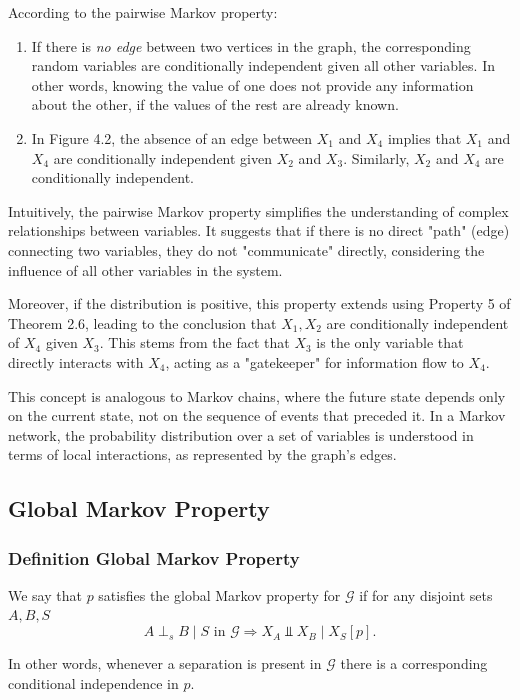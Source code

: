 \documentclass{article}
\begin{document}
According to the pairwise Markov property:

\begin{enumerate}
    \item If there is \textit{no edge} between two vertices in the graph, the corresponding random variables are conditionally independent given all other variables. In other words, knowing the value of one does not provide any information about the other, if the values of the rest are already known.
    \item In Figure 4.2, the absence of an edge between $X_1$ and $X_4$ implies that $X_1$ and $X_4$ are conditionally independent given $X_2$ and $X_3$. Similarly, $X_2$ and $X_4$ are conditionally independent.
\end{enumerate}

Intuitively, the pairwise Markov property simplifies the understanding of complex relationships between variables. It suggests that if there is no direct "path" (edge) connecting two variables, they do not "communicate" directly, considering the influence of all other variables in the system. 

Moreover, if the distribution is positive, this property extends using Property 5 of Theorem 2.6, leading to the conclusion that $X_1, X_2$ are conditionally independent of $X_4$ given $X_3$. This stems from the fact that $X_3$ is the only variable that directly interacts with $X_4$, acting as a "gatekeeper" for information flow to $X_4$.

This concept is analogous to Markov chains, where the future state depends only on the current state, not on the sequence of events that preceded it. In a Markov network, the probability distribution over a set of variables is understood in terms of local interactions, as represented by the graph's edges.
\subsection{Global Markov Property}
\subsubsection{Definition Global Markov Property}
We say that $p$ satisfies the global Markov property for $\mathcal{G}$ if for any disjoint sets $A, B, S$
$$
A \perp_s B \mid S \text { in } \mathcal{G} \Longrightarrow X_A \Perp X_B \mid X_S[p] .
$$

In other words, whenever a separation is present in $\mathcal{G}$ there is a corresponding conditional independence in $p$.
\end{document}
